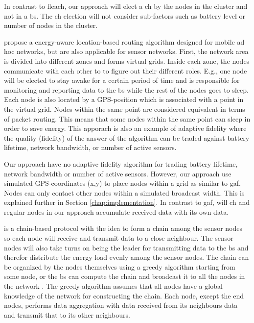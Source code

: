 \documentclass[USenglish]{uit-thesis}
\begin{document}
In contrast to \gls{fleach}, our approach will elect a \gls{ch} by the nodes in the cluster and not in a \gls{bs}. The \gls{ch} election will not consider sub-factors such as battery level or number of nodes in the cluster.


 \cite{gaf} propose a energy-aware location-based routing algorithm designed for mobile ad hoc networks, but are also applicable for sensor networks. First, the network area is divided into different zones and forms virtual grids. Inside each zone, the nodes communicate with each other to to figure out their different roles. E.g., one node will be elected to stay awake for a certain period of time and is responsible for monitoring and reporting data to the \gls{bs} while the rest of the nodes goes to sleep. Each node is also located by a GPS-position which is associated with a point in the virtual grid. Nodes within the same point are considered equivalent in terms of packet routing. This means that some nodes within the same point can sleep in order to save energy. This apporach is also an example of adaptive fidelity \cite{adfidelity} where the quality (fidelity) of the answer of the algorithm can be traded against battery lifetime, network bandwidth, or number of active sensors.

Our approach have no adaptive fidelity algorithm for trading battery lifetime, network bandwidth or number of active sensors. However, our approach use simulated GPS-coordinates (x,y) to place nodes within a grid as similar to \gls{gaf}. Nodes can only contact other nodes within a simulated broadcast width. This is explained further in Section \ref{chap:implementation}. In contrast to \gls{gaf}, will \gls{ch} and regular nodes in our approach accumulate received data  with its own data.


 is a chain-based protocol with the idea to form a chain among the sensor nodes so each node will receive and transmit data to a close neighbour. The sensor nodes will also take turns on being the leader for transmitting data to the \gls{bs} and therefor distribute the energy load evenly among the sensor nodes. The chain can be organized by the nodes themselves using a greedy algorithm starting from some node, or the \gls{bs} can compute the chain and broadcast it to all the nodes in the network \cite{pegasis}. The greedy algorithm assumes that all nodes have a global knowledge of the network for constructing the chain. Each node, except the end nodes, performs data aggregation with data received from its neighbours data and transmit that to its other neighbours.
\end{document}
